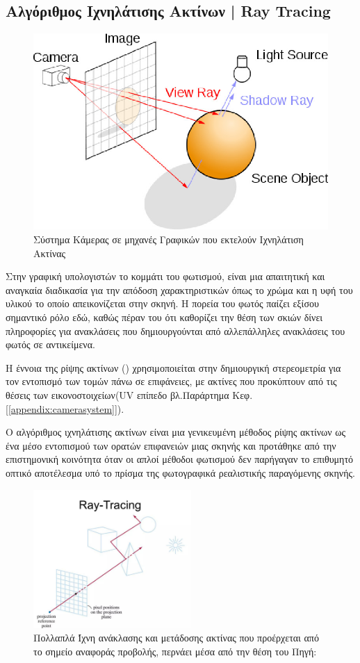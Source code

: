 \subsection{Αλγόριθμος Ιχνηλάτισης Ακτίνων | Ray Tracing}
    \begin{figure}[H]
    \centering
    \includegraphics[width = 0.5\linewidth]{images/chapter2_img/CameraSystem.jpg}
    \caption{Σύστημα Κάμερας σε μηχανές Γραφικών που εκτελούν Ιχνηλάτιση Ακτίνας}
    \label{fig:camera system}
    \end{figure}
    Στην γραφική υπολογιστών το κομμάτι του φωτισμού, είναι μια απαιτητική και αναγκαία διαδικασία για την απόδοση χαρακτηριστικών όπως το χρώμα και η υφή του υλικού το οποίο απεικονίζεται στην σκηνή. 
    Η πορεία του φωτός παίζει εξίσου σημαντικό ρόλο εδώ, καθώς πέραν του ότι καθορίζει την θέση των σκιών δίνει πληροφορίες για ανακλάσεις που δημιουργούνται από αλλεπάλληλες ανακλάσεις του φωτός σε αντικείμενα. 
    
    H έννοια της ρίψης ακτίνων () χρησιμοποιείται στην δημιουργική στερεομετρία για τον εντοπισμό των τομών πάνω σε επιφάνειες, με ακτίνες που προκύπτουν από τις θέσεις των εικονοστοιχείων(UV επίπεδο βλ.Παράρτημα Κεφ.[\ref{appendix:camerasystem}]).  
    
    Ο αλγόριθμος ιχνηλάτισης ακτίνων είναι μια γενικευμένη μέθοδος ρίψης ακτίνων ως ένα μέσο εντοπισμού των ορατών επιφανειών μιας σκηνής και προτάθηκε από την επιστημονική κοινότητα όταν οι απλοί μέθοδοι φωτισμού δεν παρήγαγαν το επιθυμητό οπτικό αποτέλεσμα υπό το πρίσμα της φωτογραφικά ρεαλιστικής παραγόμενης σκηνής.
    \begin{figure}[H]
    \centering
    \includegraphics[width=6cm]{images/chapter2_img/ray_tracing.jpg}
    \caption{Πολλαπλά Ίχνη ανάκλασης και μετάδοσης ακτίνας που προέρχεται από το σημείο αναφοράς προβολής, περνάει μέσα από την θέση του   Πηγή:\cite{hearn2011computer}}
    \label{fig:ray-tracing-setup}
    \end{figure}
    
